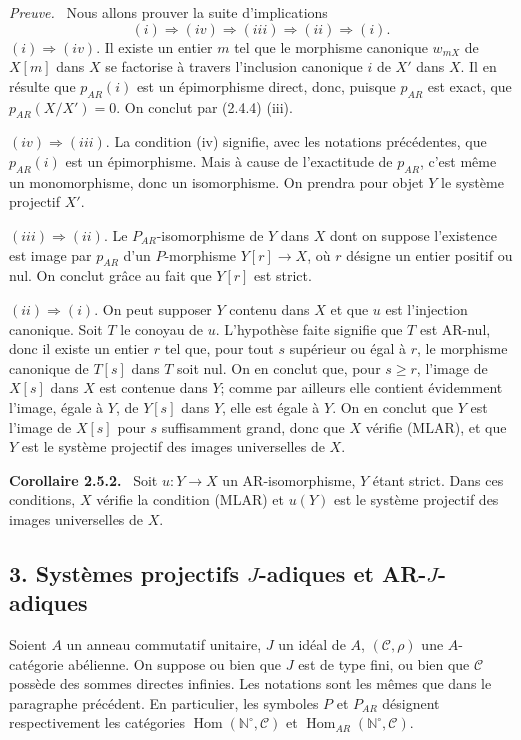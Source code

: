 \documentclass[11pt]{article}
\providecommand{\NN}{\mathbb{N}}
\newenvironment{statement}[1]{\par\medskip\noindent\textbf{#1.}\ }{\par\medskip}
\newenvironment{prooftext}[1][Proof]{\par\noindent\emph{#1.}\ }{\par\medskip}
\DeclareMathOperator{\Hom}{Hom}
\providecommand{\Hom}{\operatorname{Hom}}
\providecommand{\NN}{\mathbb N}
\providecommand{\cC}{\mathcal C}
\providecommand{\cC}{\mathcal C}
\providecommand{\Hom}{\operatorname{Hom}}
\begin{document}
\begin{prooftext}[Preuve]
Nous allons prouver la suite d'implications
\[
(i)\Rightarrow(iv)\Rightarrow(iii)\Rightarrow(ii)\Rightarrow(i).
\]
$(i)\Rightarrow(iv)$. Il existe un entier $m$ tel que le morphisme canonique $w_{mX}$ de $X[m]$ dans $X$ se factorise à travers l'inclusion canonique $i$ de $X'$ dans $X$. Il en résulte que $p_{AR}(i)$ est un épimorphisme direct, donc, puisque $p_{AR}$ est exact, que $p_{AR}(X/X')=0$. On conclut par (2.4.4) (iii).

$(iv)\Rightarrow(iii)$. La condition (iv) signifie, avec les notations précédentes, que $p_{AR}(i)$ est un épimorphisme. Mais à cause de l'exactitude de $p_{AR}$, c'est même un monomorphisme, donc un isomorphisme. On prendra pour objet $Y$ le système projectif $X'$.

$(iii)\Rightarrow(ii)$. Le $P_{AR}$-isomorphisme de $Y$ dans $X$ dont on suppose l'existence est image par $p_{AR}$ d'un $P$-morphisme $Y[r]\to X$, où $r$ désigne un entier positif ou nul. On conclut grâce au fait que $Y[r]$ est strict.

$(ii)\Rightarrow(i)$. On peut supposer $Y$ contenu dans $X$ et que $u$ est l'injection canonique. Soit $T$ le conoyau de $u$. L'hypothèse faite signifie que $T$ est AR-nul, donc il existe un entier $r$ tel que, pour tout $s$ supérieur ou égal à $r$, le morphisme canonique de $T[s]$ dans $T$ soit nul. On en conclut que, pour $s\ge r$, l'image de $X[s]$ dans $X$ est contenue dans $Y$; comme par ailleurs elle contient évidemment l'image, égale à $Y$, de $Y[s]$ dans $Y$, elle est égale à $Y$. On en conclut que $Y$ est l'image de $X[s]$ pour $s$ suffisamment grand, donc que $X$ vérifie (MLAR), et que $Y$ est le système projectif des images universelles de $X$.
\end{prooftext}

\begin{statement}{Corollaire 2.5.2}
Soit $u:Y\to X$ un AR-isomorphisme, $Y$ étant strict. Dans ces conditions, $X$ vérifie la condition (MLAR) et $u(Y)$ est le système projectif des images universelles de $X$.
\end{statement}

\subsection*{3. Systèmes projectifs $J$-adiques et AR-$J$-adiques}
Soient $A$ un anneau commutatif unitaire, $J$ un idéal de $A$, $(\cC,\rho)$ une $A$-catégorie abélienne. On suppose ou bien que $J$ est de type fini, ou bien que $\cC$ possède des sommes directes infinies. Les notations sont les mêmes que dans le paragraphe précédent. En particulier, les symboles $P$ et $P_{AR}$ désignent respectivement les catégories $\Hom(\NN^\circ,\cC)$ et $\Hom_{AR}(\NN^\circ,\cC)$.
\end{document}
